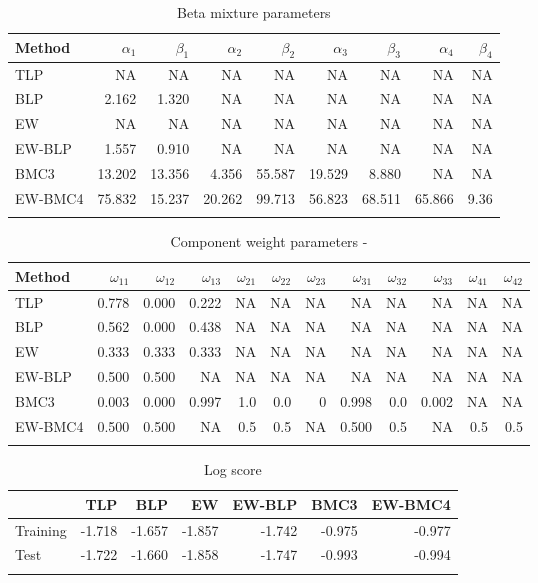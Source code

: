 \documentclass[
]{article}
\begin{document}
\begin{table}[H]

\caption{\label{tab:unnamed-chunk-24}Beta mixture parameters}
\centering
\fontsize{8}{10}\selectfont
\begin{tabular}[t]{lrrrrrrrr}
\toprule{}
Method & $\alpha_1$ & $\beta_1$ & $\alpha_2$ & $\beta_2$ & $\alpha_3$ & $\beta_3$ & $\alpha_4$ & $\beta_4$\\
\midrule{}
TLP & NA & NA & NA & NA & NA & NA & NA & NA\\
BLP & 2.162 & 1.320 & NA & NA & NA & NA & NA & NA\\
EW & NA & NA & NA & NA & NA & NA & NA & NA\\
EW-BLP & 1.557 & 0.910 & NA & NA & NA & NA & NA & NA\\
BMC3 & 13.202 & 13.356 & 4.356 & 55.587 & 19.529 & 8.880 & NA & NA\\
\addlinespace
EW-BMC4 & 75.832 & 15.237 & 20.262 & 99.713 & 56.823 & 68.511 & 65.866 & 9.36\\
\bottomrule{}
\end{tabular}
\end{table}

\begin{table}[H]

\caption{\label{tab:unnamed-chunk-24}Component weight parameters -}
\centering
\fontsize{8}{10}\selectfont
\begin{tabular}[t]{lrrrrrrrrrrr}
\toprule{}
Method & $\omega_{11}$ & $\omega_{12}$ & $\omega_{13}$ & $\omega_{21}$ & $\omega_{22}$ & $\omega_{23}$ & $\omega_{31}$ & $\omega_{32}$ & $\omega_{33}$ & $\omega_{41}$ & $\omega_{42}$\\
\midrule{}
TLP & 0.778 & 0.000 & 0.222 & NA & NA & NA & NA & NA & NA & NA & NA\\
BLP & 0.562 & 0.000 & 0.438 & NA & NA & NA & NA & NA & NA & NA & NA\\
EW & 0.333 & 0.333 & 0.333 & NA & NA & NA & NA & NA & NA & NA & NA\\
EW-BLP & 0.500 & 0.500 & NA & NA & NA & NA & NA & NA & NA & NA & NA\\
BMC3 & 0.003 & 0.000 & 0.997 & 1.0 & 0.0 & 0 & 0.998 & 0.0 & 0.002 & NA & NA\\
\addlinespace
EW-BMC4 & 0.500 & 0.500 & NA & 0.5 & 0.5 & NA & 0.500 & 0.5 & NA & 0.5 & 0.5\\
\bottomrule{}
\end{tabular}
\end{table}

\begin{table}[H]
\caption{\label{tab:unnamed-chunk-24}Log score}

\centering
\fontsize{8}{10}\selectfont
\begin{tabular}[t]{lrrrrrr}
\toprule{}
  & TLP & BLP & EW & EW-BLP & BMC3 & EW-BMC4\\
\midrule{}
Training & -1.718 & -1.657 & -1.857 & -1.742 & -0.975 & -0.977\\
Test & -1.722 & -1.660 & -1.858 & -1.747 & -0.993 & -0.994\\
\bottomrule{}
\end{tabular}
\end{table}
\end{document}
